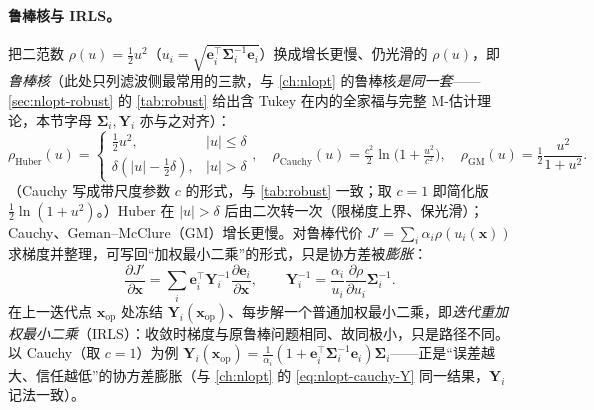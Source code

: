 \paragraph{鲁棒核与 IRLS。}
把二范数 $\rho(u)=\tfrac12u^2$（$u_i=\sqrt{\mathbf{e}_i^\top\boldsymbol{\Sigma}_i^{-1}\mathbf{e}_i}$）换成增长更慢、仍光滑的 $\rho(u)$，即\emph{鲁棒核}\cite{gaoxiang2019slam14,barfoot2024state}（此处只列滤波侧最常用的三款，与 \cref{ch:nlopt} 的鲁棒核\emph{是同一套}——\cref{sec:nlopt-robust} 的 \cref{tab:robust} 给出含 Tukey 在内的全家福与完整 M-估计理论，本节字母 $\boldsymbol{\Sigma}_i,\mathbf{Y}_i$ 亦与之对齐）：
\begin{equation}
  \rho_{\text{Huber}}(u)=\begin{cases}\tfrac12u^2,&|u|\le\delta\\ \delta(|u|-\tfrac12\delta),&|u|>\delta\end{cases},\quad
  \rho_{\text{Cauchy}}(u)=\tfrac{c^2}{2}\ln\!\Big(1+\tfrac{u^2}{c^2}\Big),\quad
  \rho_{\text{GM}}(u)=\tfrac12\frac{u^2}{1+u^2}.
  \label{eq:robust-kernels}
\end{equation}
（Cauchy 写成带尺度参数 $c$ 的形式，与 \cref{tab:robust} 一致；取 $c=1$ 即简化版 $\tfrac12\ln(1+u^2)$。）Huber 在 $|u|>\delta$ 后由二次转一次（限梯度上界、保光滑）；Cauchy、Geman–McClure（GM）增长更慢。对鲁棒代价 $J'=\sum_i\alpha_i\rho(u_i(\mathbf{x}))$ 求梯度并整理，可写回“加权最小二乘”的形式，只是协方差被\emph{膨胀}：
\begin{equation}
  \frac{\partial J'}{\partial\mathbf{x}}=\sum_i\mathbf{e}_i^\top\mathbf{Y}_i^{-1}\frac{\partial\mathbf{e}_i}{\partial\mathbf{x}},\qquad
  \mathbf{Y}_i^{-1}=\frac{\alpha_i}{u_i}\frac{\partial\rho}{\partial u_i}\boldsymbol{\Sigma}_i^{-1}.
  \label{eq:irls-weight}
\end{equation}
在上一迭代点 $\mathbf{x}_{\text{op}}$ 处冻结 $\mathbf{Y}_i(\mathbf{x}_{\text{op}})$、每步解一个普通加权最小二乘，即\emph{迭代重加权最小二乘}（IRLS）：收敛时梯度与原鲁棒问题相同、故同极小，只是路径不同。以 Cauchy（取 $c=1$）为例 $\mathbf{Y}_i(\mathbf{x}_{\text{op}})=\tfrac1{\alpha_i}(1+\mathbf{e}_i^\top\boldsymbol{\Sigma}_i^{-1}\mathbf{e}_i)\boldsymbol{\Sigma}_i$——正是“误差越大、信任越低”的协方差膨胀（与 \cref{ch:nlopt} 的 \cref{eq:nlopt-cauchy-Y} 同一结果，$\mathbf{Y}_i$ 记法一致）。

